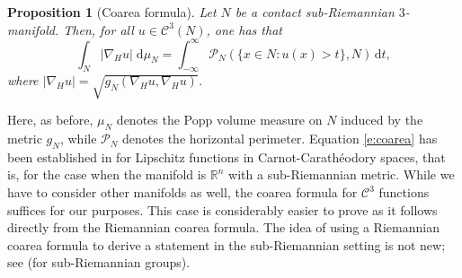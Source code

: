 \documentclass[10pt,letterpaper]{amsart}
\newtheorem{prop}[thm]{Proposition}
\theoremstyle{definition}
\numberwithin{thm}{subsection}
\numberwithin{equation}{section}
\begin{document}
\begin{prop}[Coarea formula]\label{p:coarea}
Let $N$ be a contact sub-Riemannian $3$-manifold. Then, for all
$u\in \mathcal{C}^{3}(N)$, one has that
\begin{equation}\label{e:coarea}
\int_{N} |\nabla_H u| \;\mathrm{d}\mu_{N} = \int_{-\infty}^{\infty} \mathcal{P}_N(\{x\in N: u(x)> t\}, N)\,\mathrm{d}t,
\end{equation}
where $|\nabla_H u|=  \sqrt{g_{N}(\nabla_H u,\nabla_H u)}$.
\end{prop}

Here, as before, $\mu_N$ denotes the Popp volume measure on $N$ induced by the metric $g_N$, while $\mathcal{P}_N$ denotes the horizontal perimeter. Equation \eqref{e:coarea} has been established in \cite[Theorem
4.2]{MR1865002} for Lipschitz functions in Carnot-Carath\'{e}\-odory spaces, that is,
for the case when the manifold is $\mathbb{R}^n$ with a
sub-Riemannian metric. While we have to consider other manifolds as well, the coarea formula for $\mathcal{C}^3$ functions suffices for our purposes. This case is considerably easier to prove as it follows directly from the Riemannian coarea formula. The idea of using a Riemannian coarea formula to derive a statement in the sub-Riemannian setting is not new; see \cite[Theorem 7.2.2]{bMa02} (for sub-Riemannian groups).
\end{document}
